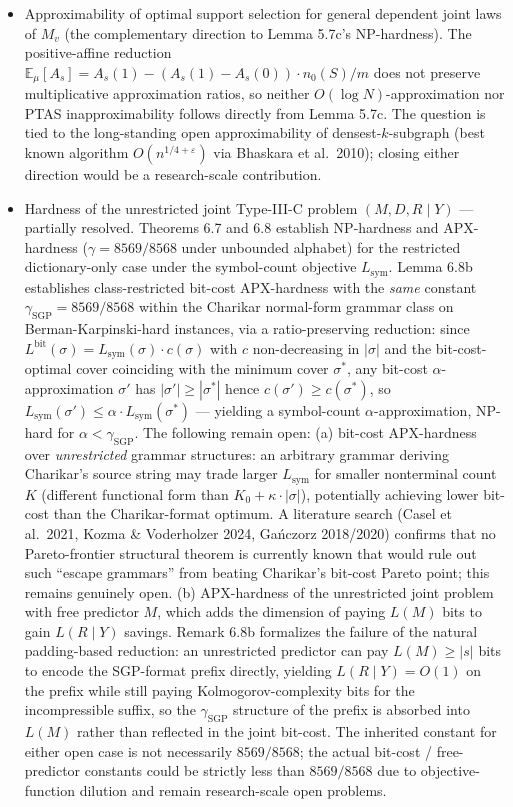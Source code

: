 \documentclass[
]{article}
\begin{document}
\begin{itemize}
\item
  Approximability of optimal support selection for general
  dependent joint laws of $M_v$ (the complementary direction to
  Lemma 5.7c's NP-hardness). The positive-affine reduction
  $\mathbb{E}_\mu[A_s] = A_s(1) - (A_s(1) - A_s(0)) \cdot n_0(S)/m$
  does not preserve multiplicative approximation ratios, so neither
  $O(\log N)$-approximation nor PTAS inapproximability follows
  directly from Lemma 5.7c. The question is tied to the
  long-standing open approximability of densest-$k$-subgraph (best
  known algorithm $O(n^{1/4+\varepsilon})$ via Bhaskara et al.\
  2010); closing either direction would be a research-scale
  contribution.
\item
  Hardness of the unrestricted joint Type-III-C problem
  $(M, D, R \mid Y)$ --- partially resolved. Theorems 6.7 and 6.8
  establish NP-hardness and APX-hardness ($\gamma = 8569/8568$ under
  unbounded alphabet) for the restricted dictionary-only case under
  the symbol-count objective $L_{\mathrm{sym}}$. Lemma 6.8b
  establishes class-restricted bit-cost APX-hardness with the
  \emph{same} constant $\gamma_{\mathrm{SGP}} = 8569/8568$ within the
  Charikar normal-form grammar class on Berman-Karpinski-hard
  instances, via a ratio-preserving reduction: since
  $L^{\mathrm{bit}}(\sigma) = L_{\mathrm{sym}}(\sigma) \cdot c(\sigma)$
  with $c$ non-decreasing in $|\sigma|$ and the bit-cost-optimal cover
  coinciding with the minimum cover $\sigma^*$, any bit-cost
  $\alpha$-approximation $\sigma'$ has $|\sigma'| \geq |\sigma^*|$
  hence $c(\sigma') \geq c(\sigma^*)$, so $L_{\mathrm{sym}}(\sigma')
  \leq \alpha \cdot L_{\mathrm{sym}}(\sigma^*)$ — yielding a
  symbol-count $\alpha$-approximation, NP-hard for $\alpha <
  \gamma_{\mathrm{SGP}}$. The following remain open:
  (a) bit-cost APX-hardness over \emph{unrestricted} grammar
  structures: an arbitrary grammar deriving Charikar's source string
  may trade larger $L_{\mathrm{sym}}$ for smaller nonterminal count
  $K$ (different functional form than $K_0 + \kappa \cdot |\sigma|$),
  potentially achieving lower bit-cost than the Charikar-format optimum.
  A literature search (Casel et al.\ 2021, Kozma \&
  Voderholzer 2024, Ga\'nczorz 2018/2020) confirms that no
  Pareto-frontier structural theorem is currently known that would
  rule out such ``escape grammars'' from beating Charikar's bit-cost
  Pareto point; this remains genuinely open. (b) APX-hardness of the
  unrestricted joint
  problem with free predictor $M$, which adds the dimension of paying
  $L(M)$ bits to gain $L(R \mid Y)$
  savings. Remark 6.8b formalizes the failure of the
  natural padding-based reduction: an unrestricted predictor can
  pay $L(M) \geq |s|$ bits to encode the SGP-format prefix directly,
  yielding $L(R \mid Y) = O(1)$ on the prefix while still paying
  Kolmogorov-complexity bits for the incompressible suffix, so the
  $\gamma_{\mathrm{SGP}}$ structure of the prefix is absorbed into
  $L(M)$ rather than reflected in the joint bit-cost. The inherited constant
  for either open case is not necessarily $8569/8568$; the actual
  bit-cost / free-predictor constants could be strictly less than
  $8569/8568$ due to objective-function dilution and remain
  research-scale open problems.


\end{itemize}
\end{document}
